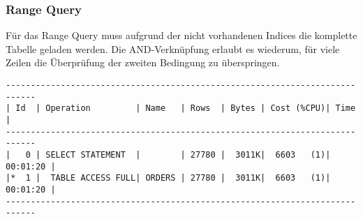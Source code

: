 \documentclass[11pt,a4paper,parskip=half]{scrartcl}
\begin{document}
\subsubsection{Range Query}
\label{no-idx-sel-range}
Für das Range Query muss aufgrund der nicht vorhandenen Indices die komplette Tabelle geladen werden. Die AND-Verknüpfung erlaubt es wiederum, für viele Zeilen die Überprüfung der zweiten Bedingung zu überspringen.

\begin{lstlisting}
----------------------------------------------------------------------------                                                                                                                                                                                                                                 
| Id  | Operation         | Name   | Rows  | Bytes | Cost (%CPU)| Time     |                                                                                                                                                                                                                                 
----------------------------------------------------------------------------                                                                                                                                                                                                                                 
|   0 | SELECT STATEMENT  |        | 27780 |  3011K|  6603   (1)| 00:01:20 |                                                                                                                                                                                                                                 
|*  1 |  TABLE ACCESS FULL| ORDERS | 27780 |  3011K|  6603   (1)| 00:01:20 |                                                                                                                                                                                                                                 
----------------------------------------------------------------------------                                                                                                                                                                                                                                 
                                                                                                                                                                                                                                                                                                             

\end{lstlisting}
\end{document}
